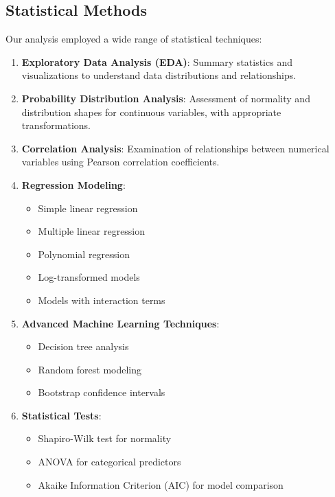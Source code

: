 \documentclass[11pt,a4paper]{article}
\begin{document}
\subsection{Statistical Methods}

Our analysis employed a wide range of statistical techniques:

\begin{enumerate}
    \item \textbf{Exploratory Data Analysis (EDA)}: Summary statistics and visualizations to understand data distributions and relationships.
    
    \item \textbf{Probability Distribution Analysis}: Assessment of normality and distribution shapes for continuous variables, with appropriate transformations.
    
    \item \textbf{Correlation Analysis}: Examination of relationships between numerical variables using Pearson correlation coefficients.
    
    \item \textbf{Regression Modeling}: 
    \begin{itemize}
        \item Simple linear regression
        \item Multiple linear regression
        \item Polynomial regression
        \item Log-transformed models
        \item Models with interaction terms
    \end{itemize}
    
    \item \textbf{Advanced Machine Learning Techniques}:
    \begin{itemize}
        \item Decision tree analysis
        \item Random forest modeling
        \item Bootstrap confidence intervals
    \end{itemize}
    
    \item \textbf{Statistical Tests}:
    \begin{itemize}
        \item Shapiro-Wilk test for normality
        \item ANOVA for categorical predictors
        \item Akaike Information Criterion (AIC) for model comparison
    \end{itemize}
\end{enumerate}
\end{document}

